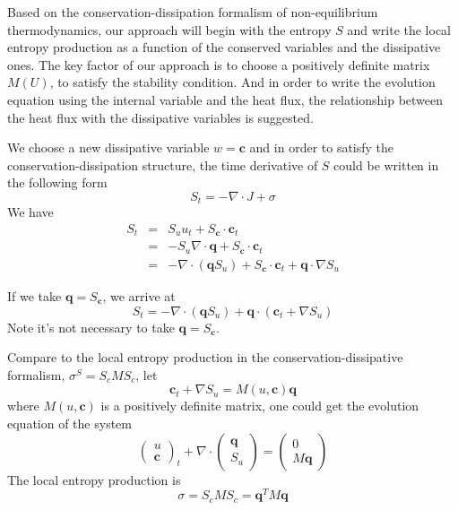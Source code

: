 \documentclass[a4paper]{article}
\begin{document}
Based on the conservation-dissipation formalism of non-equilibrium thermodynamics, our approach will begin with the entropy $S$ and write the local entropy production as a function of the conserved variables and the dissipative ones. The key factor of our approach is to choose a positively definite matrix $M(U)$, to satisfy the stability condition. And in order to write the evolution equation using the internal variable and the heat flux, the relationship between the heat flux with the dissipative variables is suggested. 

We choose a new dissipative variable $w=\mathbf{c}$ and in order to satisfy the conservation-dissipation structure, the time derivative of $S$ could be written in the following form
\begin{equation}\label{St}
S_t=-\nabla \cdot J+\sigma
\end{equation}
We have
\begin{eqnarray}
S_t &=& S_u u_t + S_\mathbf{c} \cdot \mathbf{c}_t \\
 &=& -S_u \nabla \cdot \mathbf{q} +S_\mathbf{c} \cdot \mathbf{c}_t\\
&=& -\nabla \cdot(\mathbf{q}S_u)+S_\mathbf{c} \cdot \mathbf{c}_t+\mathbf{q} \cdot \nabla S_u
\end{eqnarray}

If we take $\mathbf{q}= S_\mathbf{c}$, we arrive at
\begin{equation}
S_t = -\nabla \cdot(\mathbf{q} S_u)+\mathbf{q} \cdot (\mathbf{c}_t+\nabla S_u)
\end{equation}
Note it's not necessary to take $\mathbf{q}=S_\mathbf{c}$. 

Compare to the local entropy production in the conservation-dissipative formalism, $\sigma^S=S_c M S_c$, let
\begin{equation}
\mathbf{c}_t+ \nabla S_u=M(u,\mathbf{c}) \mathbf{q}
\end{equation}
where $M(u,\mathbf{c})$ is a positively definite matrix, one could get the evolution equation of the system
\begin{equation}
\left( \begin{array}{ll} u \\ \mathbf{c} \end{array} \right)_t + \nabla \cdot \left( \begin{array}{ll} \mathbf{q} \\ S_u \end{array} \right) = \left( \begin{array}{ll} 0 \\ M \mathbf{q} \end{array} \right)
\end{equation}
The local entropy production is
\begin{equation}
\sigma = S_c M S_c =\mathbf{q}^T M \mathbf{q}
\end{equation}
\end{document}
